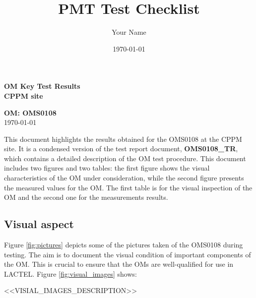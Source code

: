 \documentclass[a4paper,12pt]{article}
\title{PMT Test Checklist}
\author{Your Name}
\date{\today}
\begin{document}
	
	\begin{tcolorbox}[colframe=blue, colback=blue!10, sharp corners, width=\textwidth]
		\centering \textbf{\Large OM Key Test Results} \\
		\centering \textbf{\scriptsize CPPM site}
	\end{tcolorbox}
	\begin{center}
		\large \textbf{OM: OMS0108}\\
		\small \today
	\end{center}
	
	\vspace{1cm}
	
	This document highlights the results obtained for the OMS0108 at the CPPM site. It is a condensed version of the test report document, \textbf{OMS0108\_TR}, which contains a detailed description of the OM test procedure. This document includes two figures and two tables: the first figure shows the visual characteristics of the OM under consideration, while the second figure presents the measured values for the OM. The first table is for the visual inspection of the OM and the second one for the measurements results.
	
	
	\subsection*{Visual aspect} 
	Figure \ref{fig:pictures} depicts some of the pictures taken of the OMS0108 during testing. The aim is to document the visual condition of important components of the OM. This is crucial to ensure that the OMs are well-qualified for use in LACTEL. Figure \ref{fig:visual_images} shows:
	
	\begin{itemize}
		\setlength\itemsep{1pt}  %
		<<VISIAL_IMAGES_DESCRIPTION>>
	\end{itemize}
	
\end{document}
